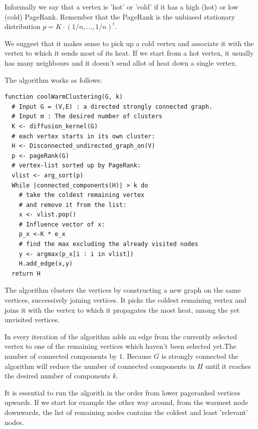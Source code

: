 Informally we say that a vertex is 'hot' or 'cold' if it has a high (hot) or low
(cold) PageRank. Remember that the PageRank is the unbiased stationary distribution
$p = K \cdot (1/n, \dots, 1/n)^t$.

We suggest that it makes sense to pick up a
cold vertex and associate it with the vertex to which it sends most of its heat.
If we start from a hot vertex, it usually has many neighbours and it doesn't
send allot of heat down a single vertex.

The algorithm works as follows:

\begin{lstlisting}
function coolWarmClustering(G, k)
  # Input G = (V,E) : a directed strongly connected graph.
  # Input m : The desired number of clusters
  K <- diffusion_kernel(G)
  # each vertex starts in its own cluster: 
  H <- Disconnected_undirected_graph_on(V) 
  p <- pageRank(G)
  # vertex-list sorted up by PageRank: 
  vlist <- arg_sort(p)
  While |connected_components(H)| > k do
    # take the coldest remaining vertex 
    # and remove it from the list:
    x <- vlist.pop()
    # Influence vector of x:
    p_x <-K * e_x 
    # find the max excluding the already visited nodes 
    y <- argmax(p_x[i : i in vlist])
    H.add_edge(x,y)
  return H
\end{lstlisting}

The algorithm clusters the vertices by constructing a new graph on the same
vertices, successively joining vertices. It picks the coldest remaining vertex
and joins it with the vertex to which it propagates the most heat, among
the yet unvisited vertices.

In every iteration of the algorithm adds an edge from the currently
selected vertex to one of the remaining vertices which haven't been
selected yet.The
number of connected components by $1$. Because $G$ is
strongly connected the algorithm will reduce the number of connected
components in $H$ until it reaches the desired number of components
$k$.

It is essential to run the algorith in the order from lower pageranked
vertices upwards. If we start for example the other way around, from
the warmest node downwards, the list of remaining nodes contains the
coldest and least 'relevant' nodes.

